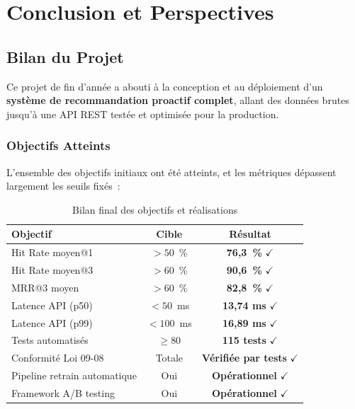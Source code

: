 \documentclass[12pt, a4paper]{report}
\begin{document}
\chapter{Conclusion et Perspectives}

\section{Bilan du Projet}

Ce projet de fin d'année a abouti à la conception et au déploiement d'un
\textbf{système de recommandation proactif complet}, allant des données
brutes jusqu'à une API REST testée et optimisée pour la production.

\subsection{Objectifs Atteints}

L'ensemble des objectifs initiaux ont été atteints, et les métriques dépassent
largement les seuils fixés~:

\begin{table}[H]
\centering
\caption{Bilan final des objectifs et réalisations}
\label{tab:bilan}
\begin{tabularx}{\textwidth}{|X|c|c|}
\hline
\textbf{Objectif} & \textbf{Cible} & \textbf{Résultat} \\
\hline
Hit Rate moyen@1 & $> 50$~\% & \textbf{76{,}3~\%} \textcolor{oncfOrange}{$\checkmark$} \\
\hline
Hit Rate moyen@3 & $> 60$~\% & \textbf{90{,}6~\%} \textcolor{oncfOrange}{$\checkmark$} \\
\hline
MRR@3 moyen & $> 60$~\% & \textbf{82{,}8~\%} \textcolor{oncfOrange}{$\checkmark$} \\
\hline
Latence API (p50) & $< 50$~ms & \textbf{13{,}74 ms} \textcolor{oncfOrange}{$\checkmark$} \\
\hline
Latence API (p99) & $< 100$~ms & \textbf{16{,}89 ms} \textcolor{oncfOrange}{$\checkmark$} \\
\hline
Tests automatisés & $\geq 80$ & \textbf{115 tests} \textcolor{oncfOrange}{$\checkmark$} \\
\hline
Conformité Loi 09-08 & Totale & \textbf{Vérifiée par tests} \textcolor{oncfOrange}{$\checkmark$} \\
\hline
Pipeline retrain automatique & Oui & \textbf{Opérationnel} \textcolor{oncfOrange}{$\checkmark$} \\
\hline
Framework A/B testing & Oui & \textbf{Opérationnel} \textcolor{oncfOrange}{$\checkmark$} \\
\hline
\end{tabularx}
\end{table}
\end{document}
